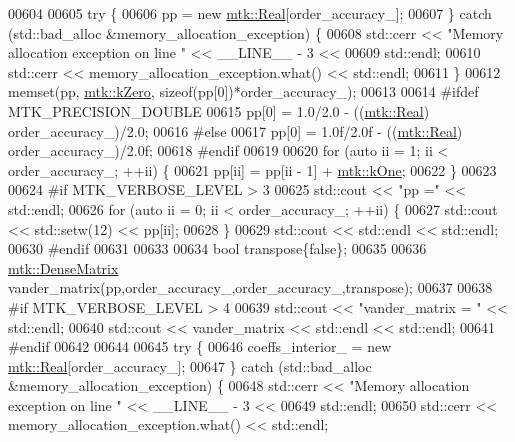 \begin{DoxyCode}
{{00604 
00605   \textcolor{keywordflow}{try} \{
00606     pp = \textcolor{keyword}{new} \hyperlink{group__c01-roots_gac080bbbf5cbb5502c9f00405f894857d}{mtk::Real}[order\_accuracy\_];
00607   \} \textcolor{keywordflow}{catch} (std::bad\_alloc &memory\_allocation\_exception) \{
00608     std::cerr << \textcolor{stringliteral}{"Memory allocation exception on line "} << \_\_LINE\_\_ - 3 <<
00609       std::endl;
00610     std::cerr << memory\_allocation\_exception.what() << std::endl;
00611   \}
00612   memset(pp, \hyperlink{group__c01-roots_ga59a451a5fae30d59649bcda274fea271}{mtk::kZero}, \textcolor{keyword}{sizeof}(pp[0])*order\_accuracy\_);
00613 
00614 \textcolor{preprocessor}{  #ifdef MTK\_PRECISION\_DOUBLE}
00615   pp[0] = 1.0/2.0 - ((\hyperlink{group__c01-roots_gac080bbbf5cbb5502c9f00405f894857d}{mtk::Real}) order\_accuracy\_)/2.0;
00616 \textcolor{preprocessor}{  #else}
00617   pp[0] = 1.0f/2.0f - ((\hyperlink{group__c01-roots_gac080bbbf5cbb5502c9f00405f894857d}{mtk::Real}) order\_accuracy\_)/2.0f;
00618 \textcolor{preprocessor}{  #endif}
00619 
00620   \textcolor{keywordflow}{for} (\textcolor{keyword}{auto} ii = 1; ii < order\_accuracy\_; ++ii) \{
00621     pp[ii] = pp[ii - 1] + \hyperlink{group__c01-roots_ga26407c24d43b6b95480943340d285c71}{mtk::kOne};
00622   \}
00623 
00624 \textcolor{preprocessor}{  #if MTK\_VERBOSE\_LEVEL > 3}
00625   std::cout << \textcolor{stringliteral}{"pp ="} << std::endl;
00626   \textcolor{keywordflow}{for} (\textcolor{keyword}{auto} ii = 0; ii < order\_accuracy\_; ++ii) \{
00627     std::cout << std::setw(12) << pp[ii];
00628   \}
00629   std::cout << std::endl << std::endl;
00630 \textcolor{preprocessor}{  #endif}
00631 
00633 
00634   \textcolor{keywordtype}{bool} transpose\{\textcolor{keyword}{false}\};
00635 
00636   \hyperlink{classmtk_1_1DenseMatrix}{mtk::DenseMatrix} vander\_matrix(pp,order\_accuracy\_,order\_accuracy\_,transpose);
00637 
00638 \textcolor{preprocessor}{  #if MTK\_VERBOSE\_LEVEL > 4}
00639   std::cout << \textcolor{stringliteral}{"vander\_matrix = "} << std::endl;
00640   std::cout << vander\_matrix << std::endl << std::endl;
00641 \textcolor{preprocessor}{  #endif}
00642 
00644 
00645   \textcolor{keywordflow}{try} \{
00646     coeffs\_interior\_ = \textcolor{keyword}{new} \hyperlink{group__c01-roots_gac080bbbf5cbb5502c9f00405f894857d}{mtk::Real}[order\_accuracy\_];
00647   \} \textcolor{keywordflow}{catch} (std::bad\_alloc &memory\_allocation\_exception) \{
00648     std::cerr << \textcolor{stringliteral}{"Memory allocation exception on line "} << \_\_LINE\_\_ - 3 <<
00649       std::endl;
00650     std::cerr << memory\_allocation\_exception.what() << std::endl;
}}
\end{DoxyCode}
